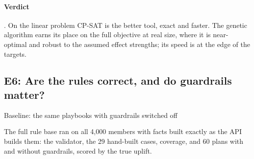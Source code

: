 \documentclass[paper=a4, fontsize=11pt, open=any, parskip=half-,
  headings=small, numbers=noenddot, captions=tableheading, toc=flat]{scrreprt}
\begin{document}
\paragraph{Verdict} . On the linear problem CP-SAT is the better tool, exact and faster. The genetic algorithm earns its place on the full objective at real size, where it is near-optimal and robust to the assumed effect strengths; its speed is at the edge of the targets.

\subsection{E6: Are the rules correct, and do guardrails matter?}
\label{sec:e6}
\quad\textsf{\small Baseline: the same playbooks with guardrails switched off}

The full rule base ran on all 4,000 members with facts built exactly as the API builds them: the validator, the 29 hand-built cases, coverage, and 60 plans with and without guardrails, scored by the true uplift.
\end{document}
